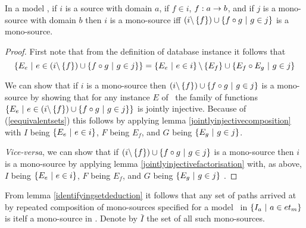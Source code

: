 \begin{lemma}
\label{identifyingsetdeduction}

In a model \genericmodel, if $i$ is a source with domain $a$,
if $f \in i$, $f: a \rightarrow b$, and if $j$ is a mono-source with domain $b$ then 
$i$ is a mono-source iff $(i \backslash \left\{f\right\}) \cup \left\{f \circ g \ \middle|\ g \in j\right\}$ is a mono-source.
\end{lemma}
\begin{proof}
First note that from the definition of database instance it follows that 
\begin{equation}
\label{eequivalentsets}
\left\{E_e \ \middle|\ e \in (i \backslash \left\{f\right\}) \cup \left\{f \circ g \ \middle|\ g \in j\right\}\right\}
= \left\{E_e \ \middle|\ e \in i\right\} \backslash \left\{E_f\right\} \cup \left\{E_f \circ E_g \ \middle|\ g \in j\right\}
\end{equation}

We can show that if $i$ is a mono-source 
then $(i \backslash \left\{f\right\}) \cup \left\{f \circ g \ \middle|\ g \in j\right\}$ is a mono-source
by showing that for any instance $E$ of \genericmodel\ the family of functions 
$\left\{E_e \ \middle|\ e \in (i \backslash \left\{f\right\}) \cup \left\{f \circ g \ \middle|\ g \in j\right\}\right\}$
is jointly injective. Because of (\ref{eequivalentsets}) this follows by applying lemma \ref{jointlyinjectivecomposition} with $I$ being $\left\{E_e \ \middle|\ e \in i\right\}$,
$F$ being $E_f$,  and $G$ being $\left\{E_g \ \middle|\ g \in j\right\}$.

\textit{Vice-versa}, we can show that if $(i \backslash \left\{f\right\}) \cup \left\{f \circ g \ \middle|\ g \in j\right\}$ is a mono-source then $i$ is a mono-source by applying lemma \ref{jointlyinjectivefactorisation} 
with, as above, $I$ being $\left\{E_e \ \middle|\ e \in i\right\}$,
$F$ being $E_f$,  and $G$ being $\left\{E_g \ \middle|\ g \in j\right\}$ .
\end{proof}

From lemma \ref{identifyingsetdeduction} it follows that any set of paths arrived at by repeated composition 
of mono-sources specified for a model \genericmodel\ in $\left\{I_a \ \middle|\ a \in et_{{m}}\right\}$ is itelf  
a mono-source in \genericmodel. Denote by $\bar{I}$ the set  of all such mono-sources.


